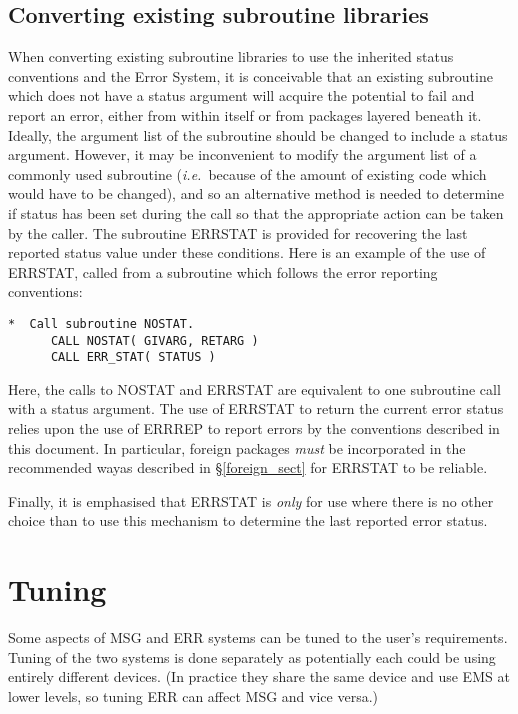 \documentclass[twoside,11pt]{article}
\newcommand{\htmlref}[2]{#1}
\newcommand{\latex}[1]{#1}
\newcommand{\xlabel}[1]{}
\renewcommand{\_}{\texttt{\symbol{95}}}
\begin{document}
\subsection{\xlabel{converting_existing_subroutine_libraries}Converting existing subroutine libraries \label{convert_sect}}

When converting existing subroutine
libraries to use the inherited status conventions and the Error System,
it is conceivable that an existing subroutine which does not have a
status argument will acquire the potential to fail and report an error, either 
from within itself or from packages layered beneath it.
Ideally, the argument list of the subroutine should be changed to include a
status argument.
However, 
it may be inconvenient to modify the argument list of a commonly used
subroutine (\textit{i.e.}\ because of the amount of existing code which would have
to be changed), and so an alternative method is needed to determine if status
has  been set during the
call so that the appropriate action can be taken by the caller.
The subroutine ERR\_STAT is provided for recovering the last reported status
value under these conditions.
Here is an example of the use of ERR\_STAT, called from a subroutine which
follows the error reporting conventions:

\begin {small}
\begin{verbatim}
*  Call subroutine NOSTAT.
      CALL NOSTAT( GIVARG, RETARG )
      CALL ERR_STAT( STATUS )
\end{verbatim}
\end {small}

Here, the calls to NOSTAT and ERR\_STAT are equivalent to one subroutine call 
with a status argument.
The use of ERR\_STAT to return the current error status relies upon the use of
ERR\_REP to report errors by the conventions described in this document.
In particular, foreign packages \emph{must} be incorporated in 
\htmlref{the recommended way}{foreign_sect}\latex{as described
in \S\ref{foreign_sect}} for ERR\_STAT to be reliable.

Finally, it is emphasised that ERR\_STAT is \emph{only} for use where there is
no other choice than to use this mechanism to determine the last reported error
status.


\section{\xlabel{tuning}Tuning\label{tuning}}
Some aspects of MSG and ERR systems can be tuned to the user's requirements.
Tuning of the two systems is done separately as potentially each could
be using entirely different devices. (In practice they share the same device
and use EMS at lower levels, so tuning ERR can affect MSG and vice versa.)
\end{document}
